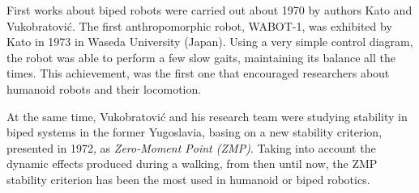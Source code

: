 
First works about biped robots were carried out about 1970 by authors Kato \cite{Kaj2005} and Vukobratović. The first anthropomorphic robot, WABOT-1, was exhibited by Kato in 1973 in Waseda University (Japan). Using a very simple control diagram, the robot was able to perform a few slow gaits, maintaining its balance all the times. This achievement, was the first one that encouraged researchers about humanoid robots and their locomotion.


At the same time, Vukobratović and his research team were studying stability in biped systems in the former Yugoslavia, basing on a new stability criterion, presented in 1972, as \textit{Zero-Moment Point (ZMP)}. Taking into account the dynamic effects produced during a walking, from then until now, the ZMP stability criterion has been the most used in humanoid or biped robotics.

